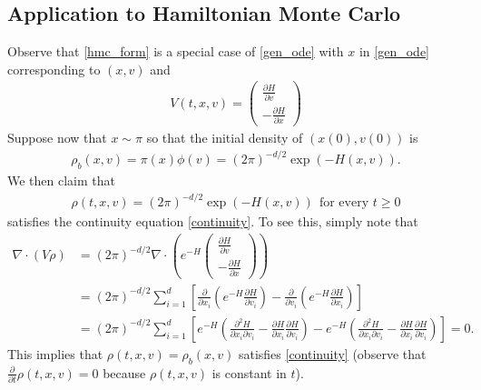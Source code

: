\documentclass{scrartcl}
\begin{document}
\subsection{Application to Hamiltonian Monte Carlo}

Observe that \eqref{hmc_form} is a special case of \eqref{gen_ode}
with $x$ in \eqref{gen_ode} corresponding to $(x, v)$ and
\begin{align*}
  V(t, x, v) = \begin{pmatrix}
    \frac{\partial H}{\partial v} \\ -\frac{\partial H}{\partial x}
  \end{pmatrix}
\end{align*}
Suppose now that $x \sim \pi$ so that the initial density of
$(x(0), v(0))$  is
\begin{align*}
\rho_b(x, v) = \pi(x) \phi(v) = (2 \pi)^{-d/2} \exp \left(-H(x, v) \right). 
\end{align*}
We then claim that
\begin{align*}
  \rho(t, x, v) = (2 \pi)^{-d/2} \exp(-H(x, v)) ~~ \text{for every $t \geq 0$}
\end{align*}
satisfies the continuity equation \eqref{continuity}. To see this,
simply note that
\begin{align*}
  \nabla \cdot \left(V \rho \right) &= (2 \pi)^{-d/2} \nabla \cdot
                                      \left(e^{-H}
                                      \begin{pmatrix}
                                            \frac{\partial H}{\partial v} \\ -\frac{\partial H}{\partial x}
                                      \end{pmatrix}
                                      \right)
  \\
  &= (2 \pi)^{-d/2} \sum_{i=1}^d \left[\frac{\partial}{\partial x_i}
    \left(e^{-H} \frac{\partial H}{\partial v_i} \right) - \frac{\partial}{\partial v_i}
    \left(e^{-H} \frac{\partial H}{\partial x_i} \right) \right] \\
&=  (2 \pi)^{-d/2} \sum_{i=1}^d \left[e^{-H} \left(\frac{\partial^2
  H}{\partial x_i \partial v_i} - \frac{\partial H}{\partial x_i}
  \frac{\partial H}{\partial v_i} \right) - e^{-H} \left(\frac{\partial^2
  H}{\partial x_i \partial v_i} - \frac{\partial H}{\partial x_i}
  \frac{\partial H}{\partial v_i} \right)\right]  = 0. 
\end{align*}
This implies that $\rho(t, x, v) = \rho_b(x, v)$ satisfies
\eqref{continuity} (observe that $\frac{\partial}{\partial t} \rho(t, x,
v) =  0$ because $\rho(t, x, v)$ is constant in $t$).
\end{document}
